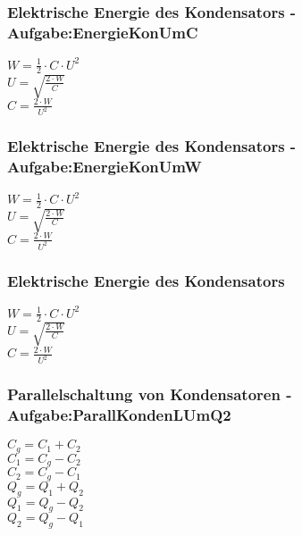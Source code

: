 \subsubsection{Elektrische Energie des Kondensators - Aufgabe:EnergieKonUmC} 
\begin{minipage}{0.45\textwidth} 
$ W =\frac{1}{2}\cdot C\cdot U^{2} $\\ 
$ U = \sqrt{\frac{2\cdot W}{ C}} $\\ 
$ C = \frac{2\cdot W}{ U^{2} } $\\ 
\end{minipage} 
\begin{minipage}{0.45\textwidth} 
 
\end{minipage} 
\subsubsection{Elektrische Energie des Kondensators - Aufgabe:EnergieKonUmW} 
\begin{minipage}{0.45\textwidth} 
$ W =\frac{1}{2}\cdot C\cdot U^{2} $\\ 
$ U = \sqrt{\frac{2\cdot W}{ C}} $\\ 
$ C = \frac{2\cdot W}{ U^{2} } $\\ 
\end{minipage} 
\begin{minipage}{0.45\textwidth} 
 
\end{minipage} 
\subsubsection{Elektrische Energie des Kondensators} 
\begin{minipage}{0.45\textwidth} 
$ W =\frac{1}{2}\cdot C\cdot U^{2} $\\ 
$ U = \sqrt{\frac{2\cdot W}{ C}} $\\ 
$ C = \frac{2\cdot W}{ U^{2} } $\\ 
\end{minipage} 
\begin{minipage}{0.45\textwidth} 
 
\end{minipage} 
\subsubsection{Parallelschaltung von Kondensatoren - Aufgabe:ParallKondenLUmQ2} 
\begin{minipage}{0.45\textwidth} 
$ C_{g}  = C_{1}  + C_{2} $\\ 
$ C_{1}  = C_{g}  - C_{2} $\\ 
$ C_{2}  = C_{g}  - C_{1} $\\ 
$ Q_{g}  = Q_{1}  + Q_{2} $\\ 
$ Q_{1}  = Q_{g}  - Q_{2} $\\ 
$ Q_{2}  = Q_{g}  - Q_{1} $\\ 
\end{minipage} 
\begin{minipage}{0.45\textwidth} 
 
\end{minipage} 
